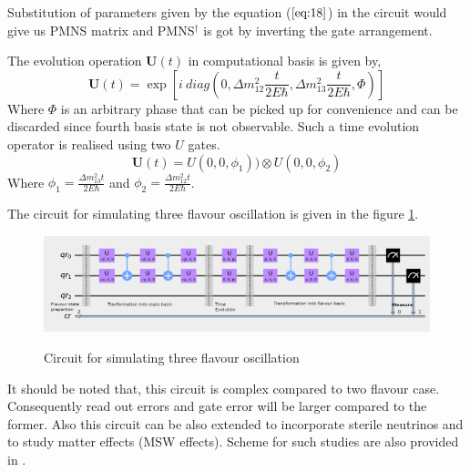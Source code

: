 \documentclass[12pt,a4paper]{report}
\begin{document}
Substitution of parameters given by the equation ($\ref{eq:18}$) in the circuit would give us PMNS matrix and PMNS$^{\dagger}$ is got by inverting the gate arrangement.\par
The evolution operation $\textbf{U}(t)$ in computational basis is given by,
\begin{equation}
\textbf{U}(t)=\exp [i \ diag(0,\Delta m_{12}^{2}\frac{t}{2E\hbar}, \Delta m_{13}^{2}\frac{t}{2E\hbar},\Phi)]
\end{equation}
Where $\Phi$ is an arbitrary phase that can be picked up for convenience and can be discarded since fourth basis state is not observable. Such a time evolution operator is realised using two $U$ gates.
\begin{equation}
\textbf{U}(t)= U(0,0,\phi_{1})) \otimes U(0,0,\phi_{2})
\end{equation}
Where $\phi_{1}=\frac{\Delta m_{13}^{2}t}{2E\hbar}$ and $\phi_{2}=\frac{\Delta m_{12}^{2}t}{2E\hbar}$.\par
The circuit for simulating three flavour oscillation is given in the figure \ref{fig 4}.
\begin{figure}[H]
\graphicspath{ {./Images/} }
\centering	
{\includegraphics[width=\textwidth]{fig_4.png}}
\caption{Circuit for simulating three flavour oscillation\cite{jones}}
\label{fig 4}
\end{figure}

It should be noted that, this circuit is complex compared to two flavour case. Consequently read out errors and gate error will be larger compared to the former. Also this circuit can be also extended to incorporate sterile neutrinos and to study matter effects (MSW effects). Scheme for such studies are also provided in \cite{jones}.
\end{document}
